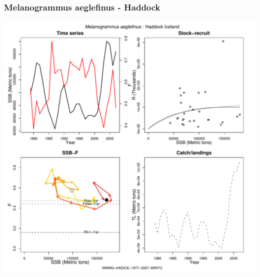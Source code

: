 \subsubsection{Melanogrammus aeglefinus - Haddock}
\begin{center}
\includegraphics[width=1.2\textwidth]{../R/figures/NWWG-HADICE-1977-2007-MINTO.pdf}
\end{center}

